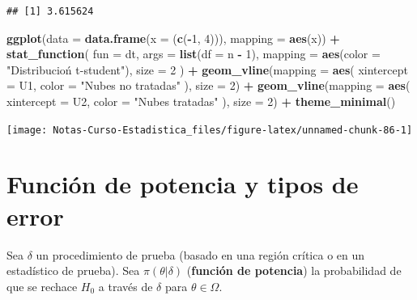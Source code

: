 \documentclass[
  12pt,
]{book}
\newenvironment{Shaded}{\begin{snugshade}}{\end{snugshade}}
\newcommand{\DataTypeTok}[1]{\textcolor[rgb]{0.13,0.29,0.53}{#1}}
\newcommand{\DecValTok}[1]{\textcolor[rgb]{0.00,0.00,0.81}{#1}}
\newcommand{\KeywordTok}[1]{\textcolor[rgb]{0.13,0.29,0.53}{\textbf{#1}}}
\newcommand{\NormalTok}[1]{#1}
\newcommand{\OperatorTok}[1]{\textcolor[rgb]{0.81,0.36,0.00}{\textbf{#1}}}
\newcommand{\StringTok}[1]{\textcolor[rgb]{0.31,0.60,0.02}{#1}}
\begin{document}
\begin{verbatim}
## [1] 3.615624
\end{verbatim}

\begin{Shaded}
\begin{Highlighting}[]
\KeywordTok{ggplot}\NormalTok{(}\DataTypeTok{data =} \KeywordTok{data.frame}\NormalTok{(}\DataTypeTok{x =}\NormalTok{ (}\KeywordTok{c}\NormalTok{(}\OperatorTok{{-}}\DecValTok{1}\NormalTok{, }\DecValTok{4}\NormalTok{))), }\DataTypeTok{mapping =} \KeywordTok{aes}\NormalTok{(x)) }\OperatorTok{+}
\StringTok{  }\KeywordTok{stat\_function}\NormalTok{(}
    \DataTypeTok{fun =}\NormalTok{ dt, }\DataTypeTok{args =} \KeywordTok{list}\NormalTok{(}\DataTypeTok{df =}\NormalTok{ n }\OperatorTok{{-}}\StringTok{ }\DecValTok{1}\NormalTok{),}
    \DataTypeTok{mapping =} \KeywordTok{aes}\NormalTok{(}\DataTypeTok{color =} \StringTok{"Distribucioń t{-}student"}\NormalTok{), }\DataTypeTok{size =} \DecValTok{2}
\NormalTok{  ) }\OperatorTok{+}
\StringTok{  }\KeywordTok{geom\_vline}\NormalTok{(}\DataTypeTok{mapping =} \KeywordTok{aes}\NormalTok{(}
    \DataTypeTok{xintercept =}\NormalTok{ U1,}
    \DataTypeTok{color =} \StringTok{"Nubes no tratadas"}
\NormalTok{  ), }\DataTypeTok{size =} \DecValTok{2}\NormalTok{) }\OperatorTok{+}
\StringTok{  }\KeywordTok{geom\_vline}\NormalTok{(}\DataTypeTok{mapping =} \KeywordTok{aes}\NormalTok{(}
    \DataTypeTok{xintercept =}\NormalTok{ U2,}
    \DataTypeTok{color =} \StringTok{"Nubes tratadas"}
\NormalTok{  ), }\DataTypeTok{size =} \DecValTok{2}\NormalTok{) }\OperatorTok{+}
\StringTok{  }\KeywordTok{theme\_minimal}\NormalTok{()}
\end{Highlighting}
\end{Shaded}

\begin{center}\texttt{[image: Notas-Curso-Estadistica\_files/figure-latex/unnamed-chunk-86-1]} \end{center}

\hypertarget{funciuxf3n-de-potencia-y-tipos-de-error}{%
\section{Función de potencia y tipos de error}\label{funciuxf3n-de-potencia-y-tipos-de-error}}

Sea \(\delta\) un procedimiento de prueba (basado en una región crítica o en un
estadístico de prueba). Sea \(\pi(\theta|\delta)\) (\textbf{función de potencia}) la
probabilidad de que se rechace \(H_0\) a través de \(\delta\) para \(\theta\in \Omega\).
\end{document}
